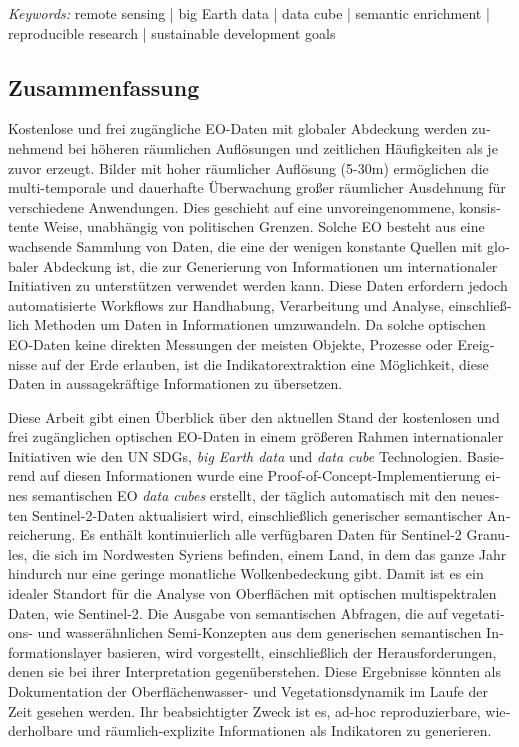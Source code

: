 \emph{Keywords:} remote sensing | big Earth data | data cube | semantic enrichment | reproducible research | sustainable development goals


\vfill



\begin{otherlanguage}{ngerman}
\clearpage
{}
\chapter*{Zusammenfassung}

Kostenlose und frei zugängliche \acs{EO}-Daten mit globaler Abdeckung werden zunehmend bei höheren räumlichen Auflösungen und zeitlichen Häufigkeiten als je zuvor erzeugt. Bilder mit hoher räumlicher Auflösung (5-30\acs{m}) ermöglichen die multi-temporale und dauerhafte Überwachung großer räumlicher Ausdehnung für verschiedene Anwendungen. Dies geschieht auf eine unvoreingenommene, konsistente Weise, unabhängig von politischen Grenzen. Solche \acs{EO} besteht aus eine wachsende Sammlung von Daten, die eine der wenigen konstante Quellen mit globaler Abdeckung ist, die zur Generierung von Informationen um internationaler Initiativen zu unterstützen verwendet werden kann. Diese Daten erfordern jedoch automatisierte Workflows zur Handhabung, Verarbeitung und Analyse, einschließlich Methoden um Daten in Informationen umzuwandeln. Da solche optischen \acs{EO}-Daten keine direkten Messungen der meisten Objekte, Prozesse oder Ereignisse auf der Erde erlauben, ist die Indikatorextraktion eine Möglichkeit, diese Daten in aussagekräftige Informationen zu übersetzen.

Diese Arbeit gibt einen Überblick über den aktuellen Stand der kostenlosen und frei zugänglichen optischen EO-Daten in einem größeren Rahmen internationaler Initiativen wie den \acs{UN} \acp{SDG}, \emph{big Earth data} und \emph{data cube} Technologien. Basierend auf diesen Informationen wurde eine Proof-of-Concept-Implementierung eines semantischen \acs{EO} \emph{data cubes} erstellt, der täglich automatisch mit den neuesten Sentinel-2-Daten aktualisiert wird, einschließlich generischer semantischer Anreicherung. Es enthält kontinuierlich alle verfügbaren Daten für Sentinel-2 Granules, die sich im Nordwesten Syriens befinden, einem Land, in dem das ganze Jahr hindurch nur eine geringe monatliche Wolkenbedeckung gibt. Damit ist es ein idealer Standort für die Analyse von Oberflächen mit optischen multispektralen Daten, wie Sentinel-2. Die Ausgabe von semantischen Abfragen, die auf vegetations- und wasserähnlichen Semi-Konzepten aus dem generischen semantischen Informationslayer basieren, wird vorgestellt, einschließlich der Herausforderungen, denen sie bei ihrer Interpretation gegenüberstehen. Diese Ergebnisse könnten als Dokumentation der Oberflächenwasser- und Vegetationsdynamik im Laufe der Zeit gesehen werden. Ihr beabsichtigter Zweck ist es, ad-hoc reproduzierbare, wiederholbare und räumlich-explizite Informationen als Indikatoren zu generieren.


\end{otherlanguage}

\endgroup

\vfill

